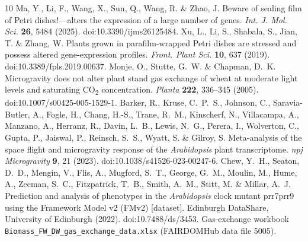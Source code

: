\documentclass[10pt]{article}
\newcommand{\co}{CO\textsubscript{2}}
\begin{document}
\begin{thebibliography}{10}
 Ma, Y., Li, F., Wang, X., Sun, Q., Wang, R. \& Zhao, J. Beware of sealing film of Petri dishes!---alters the expression of a large number of genes. \textit{Int. J. Mol. Sci.} \textbf{26}, 5484 (2025). doi:10.3390/ijms26125484.
 Xu, L., Li, S., Shabala, S., Jian, T. \& Zhang, W. Plants grown in parafilm-wrapped Petri dishes are stressed and possess altered gene-expression profiles. \textit{Front. Plant Sci.} \textbf{10}, 637 (2019). doi:10.3389/fpls.2019.00637.
 Monje, O., Stutte, G.~W. \& Chapman, D.~K. Microgravity does not alter plant stand gas exchange of wheat at moderate light levels and saturating \co{} concentration. \textit{Planta} \textbf{222}, 336--345 (2005). doi:10.1007/s00425-005-1529-1.
 Barker, R., Kruse, C.~P.~S., Johnson, C., Saravia-Butler, A., Fogle, H., Chang, H.-S., Trane, R.~M., Kinscherf, N., Villacampa, A., Manzano, A., Herranz, R., Davin, L.~B., Lewis, N.~G., Perera, I., Wolverton, C., Gupta, P., Jaiswal, P., Reinsch, S.~S., Wyatt, S. \& Gilroy, S. Meta-analysis of the space flight and microgravity response of the \textit{Arabidopsis} plant transcriptome. \textit{npj Microgravity} \textbf{9}, 21 (2023). doi:10.1038/s41526-023-00247-6.
 Chew, Y.~H., Seaton, D.~D., Mengin, V., Flis, A., Mugford, S.~T., George, G.~M., Moulin, M., Hume, A., Zeeman, S.~C., Fitzpatrick, T.~B., Smith, A.~M., Stitt, M. \& Millar, A.~J. Prediction and analysis of phenotypes in the \textit{Arabidopsis} clock mutant prr7prr9 using the Framework Model v2 (FMv2) [dataset]. Edinburgh DataShare, University of Edinburgh (2022). doi:10.7488/ds/3453. Gas-exchange workbook \texttt{Biomass\_FW\_DW\_gas\_exchange\_data.xlsx} (FAIRDOMHub data file 5005).
\end{thebibliography}
\end{document}

